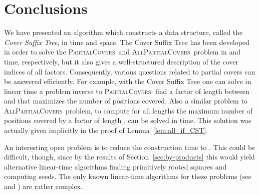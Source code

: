 \documentclass{article}
\theoremstyle{theorem}
\theoremstyle{definition}
\newcommand{\PC}{{\textsc{PartialCovers}}}
\newcommand{\APC}{{\textsc{AllPartialCovers}}}
\begin{document}
  \section{Conclusions}\label{sec:conclusions}
  We have presented an algorithm which constructs a data structure, called the
  {\em Cover Suffix Tree}, in  time and  space.
  The Cover Suffix Tree has been developed in order to solve the
  \PC\ and \APC\ problem in  and  time,
  respectively, but it also gives a well-structured description of the cover indices of all factors.
  Consequently, various questions related to partial covers can be answered efficiently.
  For example, with the Cover Suffix Tree one can solve in linear time a
  problem inverse to \PC:
  find a factor of length between  and  that maximizes the number of positions covered.
  Also a similar problem to \APC\ problem,
  to compute for all lengths  the maximum number of positions covered by a factor of length ,
  can be solved in  time.
  This solution was actually given implicitly in the proof of Lemma~\ref{lem:all_if_CST}.

  An interesting open problem is to reduce the construction time to .
  This could be difficult, though, since by the results of Section~\ref{sec:by-products}
  this would yield alternative linear-time algorithms finding primitively rooted squares
  and computing seeds.
  The only known linear-time algorithms for these problems
  (see \cite{DBLP:journals/jcss/GusfieldS04,Crochemore2013,DBLP:conf/spire/CrochemoreIKRRW10} and \cite{DBLP:conf/soda/KociumakaKRRW12})
  are rather complex.

   
  
  
\end{document}
